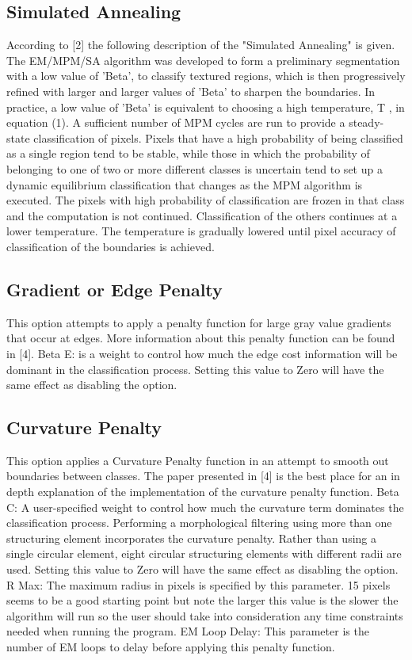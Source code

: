 \documentclass[12pt,oneside]{book}
\begin{document}
\subsection{Simulated Annealing}
According to [2] the following description of the "Simulated Annealing" is given. The EM/MPM/SA algorithm was developed to form a preliminary segmentation with a low value of 'Beta', to classify textured regions, which is then progressively refined with larger and larger values of 'Beta' to sharpen the boundaries. In practice, a low value of 'Beta' is equivalent to choosing a high temperature, T , in equation (1). A sufficient number of MPM cycles are run to provide a steady-state classification of pixels. Pixels that have a high probability of being classified as a single region tend to be stable, while those in which the probability of belonging to one of two or more different classes is uncertain tend to set up a dynamic equilibrium classification that changes as the MPM algorithm is executed. The pixels with high probability of classification are frozen in that class and the computation is not continued. Classification of the others continues at a lower temperature. The temperature is gradually lowered until pixel accuracy of classification of the boundaries is achieved. 
 

\subsection{Gradient or Edge Penalty}
This option attempts to apply a penalty function for large gray value gradients that occur at edges. More information about this penalty function can be found in [4]. 
	Beta E:  is a weight to control how much the edge cost information will be dominant in the classification process. Setting this value to Zero will have the same effect as disabling the option.

\subsection{Curvature Penalty}
This option applies a Curvature Penalty function in an attempt to smooth out boundaries between classes. The paper presented in [4] is the best place for an in depth explanation of the implementation of the curvature penalty function. 
	Beta C:  A user-specified weight to control how much the curvature term dominates the classification process. Performing a morphological filtering using more than one structuring element incorporates the curvature penalty. Rather than using a single circular element, eight circular structuring elements with different radii are used. Setting this value to Zero will have the same effect as disabling the option. 
	R Max:  The maximum radius in pixels is specified by this parameter. 15 pixels seems to be a good starting point but note the larger this value is the slower the algorithm will run so the user should take into consideration any time constraints needed when running the program. 
	EM Loop Delay: This parameter is the number of EM loops to delay before applying this penalty function.
\end{document}
